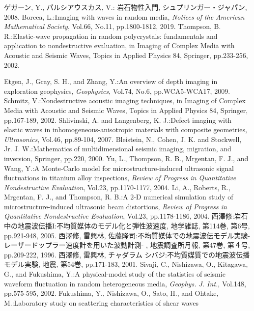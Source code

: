 \documentclass{jsce}
\begin{document}
\begin{thebibliography}{99}
\begin{spacing}{1.175}
	ゲガーン, Y., パルシアウスカス, V.: 
	岩石物性入門, シュプリンガー・ジャパン, 2008. 
	Borcea, L.:Imaging with waves in random media, {\it Notices of the American Mathematical Society}, Vol.66, No.11, 
	pp.1800-1812, 2019.
	Thompson, B. R.:Elastic-wave propagation in random polycrystals: 
	fundamentals and application to nondestructive evaluation, 
	in Imaging of Complex Media with Acoustic and Seismic Waves, Topics in Applied Physics 84, Springer, pp.233-256, 2002.

	Etgen, J., Gray, S. H., and Zhang, Y.:An overview of depth imaging in exploration geophysics, 
	{\it Geophysics}, Vol.74, No.6, pp.WCA5-WCA17, 2009.
	Schmitz, V.:Nondestructive acoustic imaging techniques, in Imaging of Complex Media with Acoustic and Seismic Waves, 
	Topics in Applied Physics 84, Springer, pp.167-189, 2002.
	Shlivinski, A. and Langenberg, K. J.:Defect imaging with elastic waves in inhomogeneous-anisotropic materials with composite geometries, {\it Ultrasonics}, Vol.46, pp.89-104, 2007.
	Bleistein, N., Cohen, J. K. and Stockwell, Jr. J. W.:Mathematics of multidimensional seismic imaging, migration, and inversion, Springer, pp.220, 2000.
	Yu, L., Thompson, R. B., Mrgentan, F. J., and Wang, Y.:A Monte-Carlo model for microstructure-induced ultrasonic signal fluctuations in titanium alloy inspections,
	{\it Review of Progress in Quantitative Nondestructive Evaluation}, Vol.23, pp.1170-1177, 2004.
	Li, A., Roberts, R., Mrgentan, F. J., and Thompson, R. B.:A 2-D numerical simulation study of microstructure-induced  ultrasonic beam distortions,
	{\it Review of Progress in Quantitative Nondestructive Evaluation}, Vol.23, pp.1178-1186, 2004.
	西澤修:岩石中の地震波伝播I:不均質媒体のモデル化と弾性波速度, 地学雑誌, 第114巻, 第6号,  pp.921-948,  2005.
\lastpagecontrol[0.0cm]{9.0cm}
\newpage
{}
	西澤修, 雷興林, 佐藤隆司:不均質媒体での地震波伝モデル実験-レーザードップラー速度計を用いた波動計測-
	, 地震調査所月報, 第47巻, 第４号, pp.209-222, 1996.
	西澤修, 雷興林, チャダラム シバジ:不均質媒質での地震波伝播モデル実験, 
	地震, 第54巻, pp.171-183, 2001.
	Sivaji, C., Nishizawa, O., Kitagawa, G., and Fukushima, Y.:A physical-model study of the statistics of seismic waveform fluctuation in random heterogeneous media, 
	{\it Geophys. J. Int.}, Vol.148, pp.575-595, 2002. 
	Fukushima, Y., Nishizawa, O., Sato, H., and Ohtake, M.:Laboratory study on scattering characteristics of shear waves 

\end{spacing}
\end{thebibliography}
\end{document}
